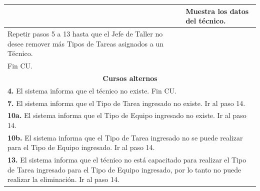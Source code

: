 \documentclass[12pt]{extarticle}
\begin{document}
\begin{spacing}{1.2}
\begin{longtable}{ |p{8cm}|p{8cm}| }
			& \inc Muestra los datos del técnico.\\
			\hline
			\inc Repetir pasos 5 a 13 hasta que el Jefe de Taller no desee remover más Tipos de Tareas asignados a un Técnico.&\\
			\hline
			\inc Fin CU.& \\
		\hline
		\multicolumn{2}{|c|}{\textbf{Cursos alternos}}\\
		\hline
		\multicolumn{2}{|p{16cm}|}{\textbf{4. }El sistema informa que el técnico no existe. Fin CU.}\\
		\hline
		\multicolumn{2}{|p{16cm}|}{\textbf{7. }El sistema informa que el Tipo de Tarea ingresado no existe. Ir al paso 14.}\\
		\hline
		\multicolumn{2}{|p{16cm}|}{\textbf{10a. }El sistema informa que el Tipo de Equipo ingresado no existe. Ir al paso 14. }\\
		\hline
		\multicolumn{2}{|p{16cm}|}{\textbf{10b. }El sistema informa que el Tipo de Tarea ingresado no se puede realizar para el Tipo de Equipo ingresado. Ir al paso 14. }\\
		\hline
		\multicolumn{2}{|p{16cm}|}{\textbf{13. }El sistema informa que el técnico no está capacitado para realizar el Tipo de Tarea ingresado para el Tipo de Equipo ingresado, por lo tanto no puede realizar la eliminación. Ir al paso 14.}\\
		\hline
	\end{longtable}


    \finCU{}




\end{spacing}
\end{document}
